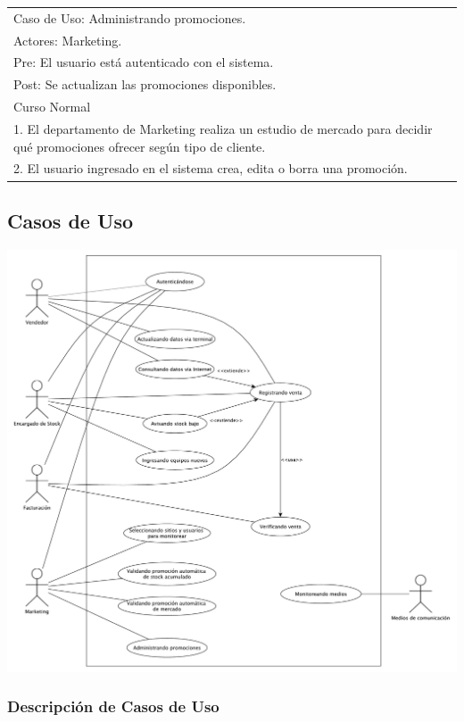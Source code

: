 \vspace{1cm}

\begin{tabular}{ | p{14cm} | }
  \hline
  Caso de Uso: Administrando promociones. \\
  Actores: Marketing. \\
  Pre: El usuario está autenticado con el sistema. \\
  Post: Se actualizan las promociones disponibles. \\
  \hline
  Curso Normal\\
  \hline
  1. El departamento de Marketing realiza un estudio de mercado para decidir qué promociones ofrecer según tipo de cliente. \\
  2. El usuario ingresado en el sistema crea, edita o borra una promoción. \\
  \hline
\end{tabular}

\subsection{Casos de Uso}


\includegraphics[width=1.1\textwidth]{./imagenes/casos_de_uso.pdf}

\clearpage

\subsubsection{Descripción de Casos de Uso}

